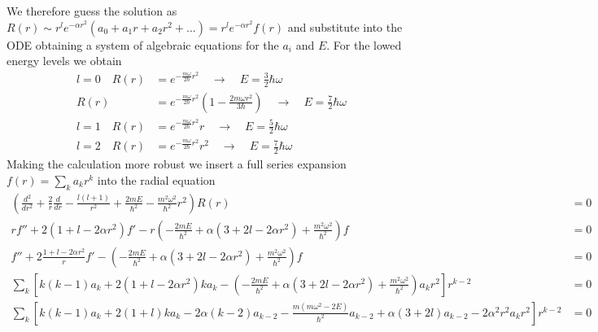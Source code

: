 \documentclass[10pt,a4paper]{book}
\theoremstyle{definition}
\begin{document}
\begin{enumerate}[(a)]
We therefore guess the solution as $R(r)\sim r^le^{-\alpha r^2}(a_0+a_1 r+a_2 r^2+...)= r^le^{-\alpha r^2}f(r)$ and substitute into the ODE obtaining a system of algebraic equations for the $a_i$ and $E$. For the lowed energy levels we obtain
\begin{align}
l=0\quad
R(r)&=e^{-\frac{m\omega}{2\hbar}r^2}\quad\rightarrow\quad E=\frac{3}{2}\hbar\omega\\
R(r)&=e^{-\frac{m\omega}{2\hbar}r^2}\left(1-\frac{2m\omega r^2}{3\hbar}\right)\quad\rightarrow\quad E=\frac{7}{2}\hbar\omega\\
l=1\quad
R(r)&=e^{-\frac{m\omega}{2\hbar}r^2}r\quad\rightarrow\quad E=\frac{5}{2}\hbar\omega\\
l=2\quad
R(r)&=e^{-\frac{m\omega}{2\hbar}r^2}r^2\quad\rightarrow\quad E=\frac{7}{2}\hbar\omega
\end{align}
Making the calculation more robust we insert a full series expansion $f(r)=\sum_ka_kr^k$ into the radial equation
\begin{align*}
\left(\frac{d^2}{dr^2}+\frac{2}{r}\frac{d}{dr}-\frac{l(l+1)}{r^2}+\frac{2mE}{\hbar^2}-\frac{m^2\omega^2}{\hbar^2}r^2\right)R(r)&=0\\
rf''+2(1+l-2\alpha r^2)f'-r\left(-\frac{2mE}{\hbar^2}+\alpha(3+2l-2\alpha r^2)+\frac{m^2\omega^2}{\hbar^2}\right)f&=0\\
f''+2\frac{1+l-2\alpha r^2}{r}f'-\left(-\frac{2mE}{\hbar^2}+\alpha(3+2l-2\alpha r^2)+\frac{m^2\omega^2}{\hbar^2}\right)f&=0\\
\sum_k\left[k(k-1)a_k+2(1+l-2\alpha r^2)ka_k-\left(-\frac{2mE}{\hbar^2}+\alpha(3+2l-2\alpha r^2)+\frac{m^2\omega^2}{\hbar^2}\right)a_kr^2\right]r^{k-2}&=0\\
\sum_k\left[k(k-1)a_k+2(1+l)ka_k-2\alpha (k-2)a_{k-2}-\frac{m(m\omega^2-2E)}{\hbar^2}a_{k-2}+\alpha(3+2l)a_{k-2}-2\alpha^2 r^2a_kr^2\right]r^{k-2}&=0\\
\end{align*}


\end{enumerate}
\end{document}
